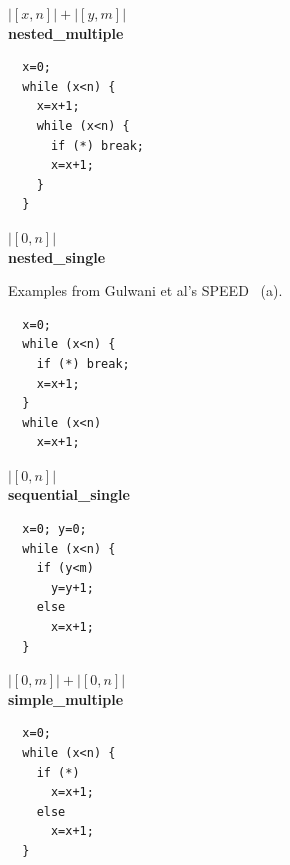 \documentclass[nocopyrightspace,preprint,pldi]{sigplanconf-pldi15}
\begin{document}
{\begin{figure}
\begin{minipage}[b]{\progwidth}
\begin{center}
$|[x, n]| + |[y, m]|$
\\[.7\baselineskip]
      {\bf nested\_multiple}
    \end{center}
  \end{minipage}
%
%
  \begin{minipage}[b]{\progwidth}
    \begin{center}
   \begin{lstlisting}
  x=0;
  while (x<n) {
    x=x+1;
    while (x<n) {
      if (*) break;
      x=x+1;
    }
  }
   \end{lstlisting}

$|[0, n]|$
\\[.7\baselineskip]
      {\bf nested\_single}
    \end{center}
  \end{minipage}

   \caption{Examples from Gulwani et al's SPEED~\cite{GulwaniMC09} (a).}
  \label{fig:cat2a}
\end{figure}

\begin{figure}
 \setlength{\progwidth}{.24\linewidth}
  \centering
  \begin{minipage}[b]{\progwidth}
    \begin{center}
   \begin{lstlisting}
  x=0;
  while (x<n) {
    if (*) break;
    x=x+1;
  }
  while (x<n)
    x=x+1;
   \end{lstlisting}

$|[0,n]|$
\\[.7\baselineskip]
      {\bf sequential\_single}
    \end{center}
  \end{minipage}
%
%
  \begin{minipage}[b]{\progwidth}
    \begin{center}
   \begin{lstlisting}
  x=0; y=0;
  while (x<n) {
    if (y<m)
      y=y+1;
    else
      x=x+1;
  }
   \end{lstlisting}
$|[0, m]| + |[0, n]|$
\\[.7\baselineskip]
      {\bf simple\_multiple}
    \end{center}
  \end{minipage}
%
%
  \begin{minipage}[b]{\progwidth}
    \begin{center}
   \begin{lstlisting}
  x=0;
  while (x<n) {
    if (*)
      x=x+1;
    else
      x=x+1;
  }
   \end{lstlisting}


\end{center}
\end{minipage}
\end{figure}}
\end{document}
